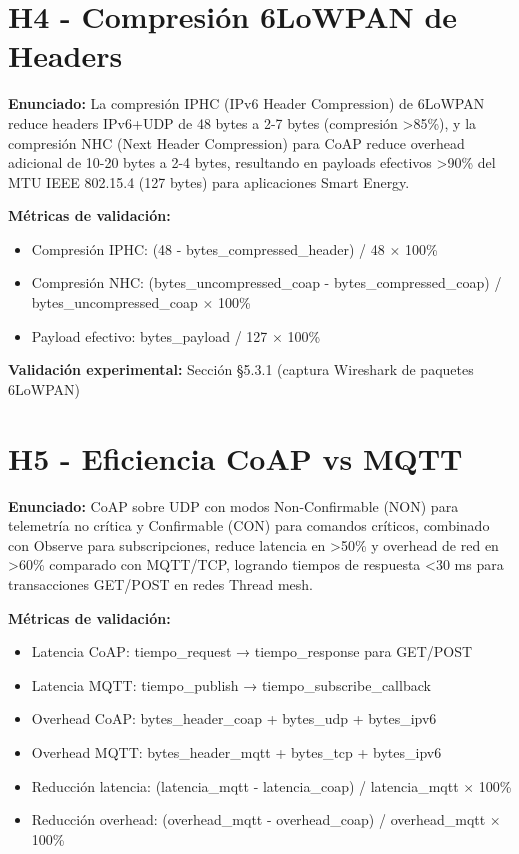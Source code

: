 \section{H4 - Compresión 6LoWPAN de Headers}

\textbf{Enunciado:} La compresión IPHC (IPv6 Header Compression) de 6LoWPAN reduce headers IPv6+UDP de 48 bytes a 2-7 bytes (compresión >85\%), y la compresión NHC (Next Header Compression) para CoAP reduce overhead adicional de 10-20 bytes a 2-4 bytes, resultando en payloads efectivos >90\% del MTU IEEE 802.15.4 (127 bytes) para aplicaciones Smart Energy.

\textbf{Métricas de validación:}
\begin{itemize}
\item Compresión IPHC: (48 - bytes\_compressed\_header) / 48 $\times$ 100\%
\item Compresión NHC: (bytes\_uncompressed\_coap - bytes\_compressed\_coap) / bytes\_uncompressed\_coap $\times$ 100\%
\item Payload efectivo: bytes\_payload / 127 $\times$ 100\%
\end{itemize}

\textbf{Validación experimental:} Sección §5.3.1 (captura Wireshark de paquetes 6LoWPAN)

\section{H5 - Eficiencia CoAP vs MQTT}

\textbf{Enunciado:} CoAP sobre UDP con modos Non-Confirmable (NON) para telemetría no crítica y Confirmable (CON) para comandos críticos, combinado con Observe para subscripciones, reduce latencia en >50\% y overhead de red en >60\% comparado con MQTT/TCP, logrando tiempos de respuesta <30 ms para transacciones GET/POST en redes Thread mesh.

\textbf{Métricas de validación:}
\begin{itemize}
\item Latencia CoAP: tiempo\_request → tiempo\_response para GET/POST
\item Latencia MQTT: tiempo\_publish → tiempo\_subscribe\_callback
\item Overhead CoAP: bytes\_header\_coap + bytes\_udp + bytes\_ipv6
\item Overhead MQTT: bytes\_header\_mqtt + bytes\_tcp + bytes\_ipv6
\item Reducción latencia: (latencia\_mqtt - latencia\_coap) / latencia\_mqtt $\times$ 100\%
\item Reducción overhead: (overhead\_mqtt - overhead\_coap) / overhead\_mqtt $\times$ 100\%
\end{itemize}

